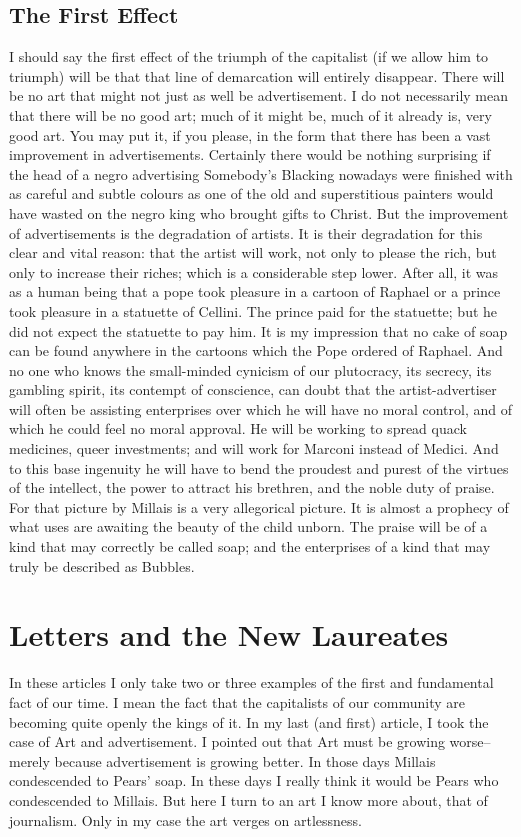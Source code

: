 \documentclass{book}
\begin{document}
\section{The First Effect}
I should say the first effect of the triumph of the capitalist (if we allow him to triumph) will be that that line of demarcation will entirely disappear. There will be no art that might not just as well be advertisement. I do not necessarily mean that there will be no good art; much of it might be, much of it already is, very good art. You may put it, if you please, in the form that there has been a vast improvement in advertisements. Certainly there would be nothing surprising if the head of a negro advertising Somebody’s Blacking nowadays were finished with as careful and subtle colours as one of the old and superstitious painters would have wasted on the negro king who brought gifts to Christ. But the improvement of advertisements is the degradation of artists. It is their degradation for this clear and vital reason: that the artist will work, not only to please the rich, but only to increase their riches; which is a considerable step lower. After all, it was as a human being that a pope took pleasure in a cartoon of Raphael or a prince took pleasure in a statuette of Cellini. The prince paid for the statuette; but he did not expect the statuette to pay him. It is my impression that no cake of soap can be found anywhere in the cartoons which the Pope ordered of Raphael. And no one who knows the small-minded cynicism of our plutocracy, its secrecy, its gambling spirit, its contempt of conscience, can doubt that the artist-advertiser will often be assisting enterprises over which he will have no moral control, and of which he could feel no moral approval. He will be working to spread quack medicines, queer investments; and will work for Marconi instead of Medici. And to this base ingenuity he will have to bend the proudest and purest of the virtues of the intellect, the power to attract his brethren, and the noble duty of praise. For that picture by Millais is a very allegorical picture. It is almost a prophecy of what uses are awaiting the beauty of the child unborn. The praise will be of a kind that may correctly be called soap; and the enterprises of a kind that may truly be described as Bubbles.

\chapter{Letters and the New Laureates}
\label{chapter-1}
In these articles I only take two or three examples of the first and fundamental fact of our time. I mean the fact that the capitalists of our community are becoming quite openly the kings of it. In my last (and first) article, I took the case of Art and advertisement. I pointed out that Art must be growing worse–merely because advertisement is growing better. In those days Millais condescended to Pears’ soap. In these days I really think it would be Pears who condescended to Millais. But here I turn to an art I know more about, that of journalism. Only in my case the art verges on artlessness.
\end{document}

